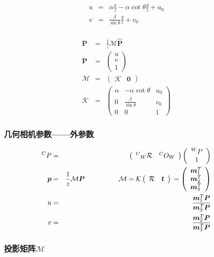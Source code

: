 \documentclass{beamer}
\newcommand{\tmmathbf}[1]{\ensuremath{\boldsymbol{#1}}}
\newcommand{\tmverbatim}[1]{\text{{\ttfamily{#1}}}}
\begin{document}
{{\begin{frame}
  \begin{eqnarray*}
    u & = & \alpha \frac{x}{z} - \alpha \cot \theta \frac{y}{z} + u_0\\
    v & = & \frac{\beta}{\sin \theta} \frac{y}{z} + v_0
  \end{eqnarray*}
\end{frame}}{\begin{frame}
  \frametitle{}
  \begin{eqnarray*}
    \tmmathbf{P} & = & \frac{1}{z} \mathcal{M} \hat{\tmmathbf{P}}\\
    \tmmathbf{P} & = & \left(\begin{array}{c}
      u\\
      v\\
      1
    \end{array}\right)\\
    \mathcal{M} & = & \left(\begin{array}{cc}
      \mathcal{K} & \tmmathbf{0}
    \end{array}\right)\\
    \mathcal{K} & = & \left(\begin{array}{ccc}
      \alpha & - \alpha \cot \theta & u_0\\
      0 & \frac{\beta}{\sin \theta} & v_0\\
      0 & 0 & 1
    \end{array}\right)
  \end{eqnarray*}
\end{frame}}{\begin{frame}
  \frametitle{几何相机参数------外参数}
  \begin{eqnarray*}
    {}^C P & = & \left(\begin{array}{cc}
      {}^C {}_W \mathcal{R} & {}^C O_W
    \end{array}\right) \left(\begin{array}{c}
      {}^W P\\
      1
    \end{array}\right)\\
    \tmmathbf{p} & = & \frac{1}{z} \mathcal{M}\tmmathbf{P} \hspace{5em}
    \mathcal{M}=\mathcal{K} \left(\begin{array}{cc}
      \mathcal{R} & \tmmathbf{t}
    \end{array}\right) \texttt{\tmverbatim{}} = \left(\begin{array}{c}
      \tmmathbf{m}_1^T\\
      \tmmathbf{m}_2^T\\
      \tmmathbf{m}^T_3
    \end{array}\right)\\
    u & = & \frac{\tmmathbf{m}_1^T \tmmathbf{P}}{\tmmathbf{m}_3^T
    \tmmathbf{P}}\\
    v & = & \frac{\tmmathbf{m}_2^T \tmmathbf{P}}{\tmmathbf{m}_3^T
    \tmmathbf{P}}
  \end{eqnarray*}
\end{frame}}{\begin{frame}
  \frametitle{投影矩阵$\mathcal{M}$}
  

\end{frame}}}
\end{document}
